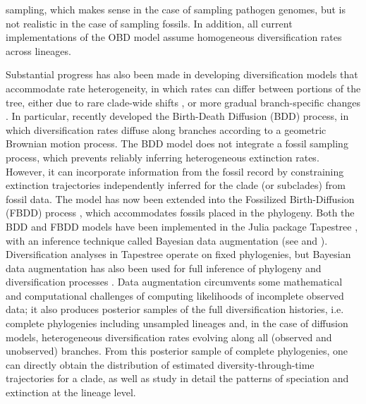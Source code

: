 \documentclass[oupdraft]{sysbio}
\begin{document}
sampling, which makes sense in the case of sampling pathogen genomes, but is not realistic in the case of sampling fossils. In addition, all current implementations of the OBD model assume homogeneous diversification rates across lineages.

Substantial progress has also been made in developing diversification models that accommodate rate heterogeneity, in which rates can differ between portions of the tree, either due to rare clade-wide shifts \citep{rabosky_automatic_2014, mitchell_inferring_2019, maddison_estimating_2007, caetano_hidden_2018}, or more gradual branch-specific changes \citep{maliet_model_2019, quintero_imbalanced_2024}. In particular, \citet{quintero_imbalanced_2024} recently developed the Birth-Death Diffusion (BDD) process, in which diversification rates diffuse along branches according to a geometric Brownian motion process. The BDD model does not integrate a fossil sampling process, which prevents reliably inferring heterogeneous extinction rates. However, it can incorporate information from the fossil record by constraining extinction trajectories independently inferred for the clade (or subclades) from fossil data. The model has now been extended into the Fossilized Birth-Diffusion (FBDD) process \citep{quintero_rise_2025}, which accommodates fossils placed in the phylogeny. Both the BDD and FBDD models have been implemented in the Julia package Tapestree \citep{quintero_tapestreejl_2020}, with an inference technique called Bayesian data augmentation (see  and \citet{tanner_calculation_1987, maliet_fast_2022}). Diversification analyses in Tapestree operate on fixed phylogenies, but Bayesian data augmentation has also been used for full inference of phylogeny and diversification processes \citep{barido-sottani_clads_2023, chabrol_fossilized_2025}. Data augmentation circumvents some mathematical and computational challenges of computing likelihoods of incomplete observed data; it also produces posterior samples of the full diversification histories, i.e. complete phylogenies including unsampled lineages and, in the case of diffusion models, heterogeneous diversification rates evolving along all (observed and unobserved) branches. From this posterior sample of complete phylogenies, one can directly obtain the distribution of estimated diversity-through-time trajectories for a clade, as well as study in detail the patterns of speciation and extinction at the lineage level.
\end{document}
